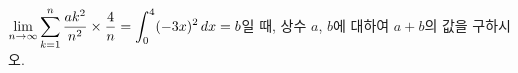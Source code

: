 \hspace*{2mm}\begin{minipage}[t]{\dimexpr\linewidth-2mm\relax}\vspace{0pt}
$\displaystyle\lim_{n\to\infty}\sum_{k=1}^{n}\dfrac{ak^2}{n^2}\times\dfrac{4}{n}=\int_{0}^{4}(-3x)^2\mkern3mu dx=b$일 때, 상수 $a$, $b$에 대하여 $a+b$의 값을 구하시오.\end{minipage}
